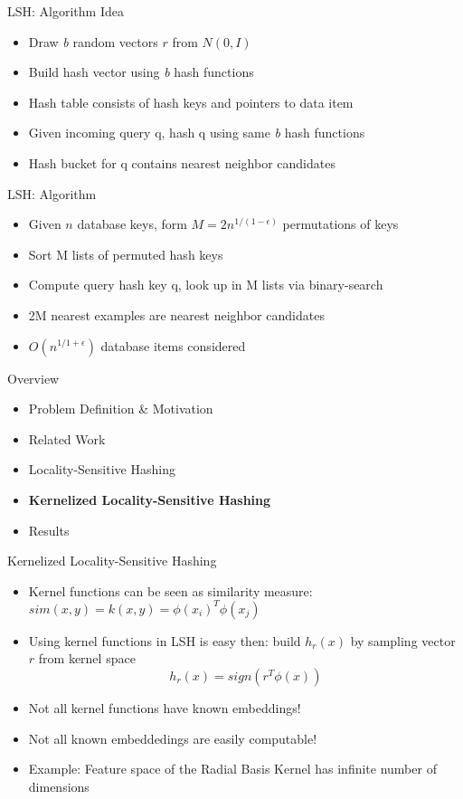 \documentclass[12pt,a4paper]{beamer}
\begin{document}
\begin{frame}{LSH: Algorithm Idea}
\begin{itemize}
\item Draw \textit{b} random vectors $r$ from $N(0,I)$
\item Build hash vector using \textit{b} hash functions
\item Hash table consists of hash keys and pointers to data item
\item Given incoming query q, hash q using same \textit{b} hash functions
\item Hash bucket for q contains nearest neighbor candidates
\end{itemize}
\end{frame}

\begin{frame}{LSH: Algorithm}
\begin{itemize}
\item Given $n$ database keys, form $M=2n^{1/(1-\epsilon)}$ permutations of keys
\item Sort M lists of permuted hash keys
\item Compute query hash key q, look up in M lists via binary-search
\item 2M nearest examples are nearest neighbor candidates
\item $O(n^{1/1+\epsilon})$ database items considered
\end{itemize}
\end{frame}

\begin{frame}{Overview}
\begin{itemize}
\item Problem Definition \& Motivation
\item Related Work
\item Locality-Sensitive Hashing
\item \textbf{Kernelized Locality-Sensitive Hashing}
\item Results
\end{itemize}
\end{frame}

\begin{frame}{Kernelized Locality-Sensitive Hashing}
\begin{itemize}
\item Kernel functions can be seen as similarity measure: $sim(x,y) = k(x,y) = \phi(x_{i})^{T}\phi(x_{j}) $
\item Using kernel functions in LSH is easy then: build $h_r(x)$ by sampling vector $r$ from kernel space
$$h_r(x)=sign(r^T\phi(x))$$
\item Not all kernel functions have known embeddings! \cite{klsh}
\item Not all known embeddedings are easily computable!
\item Example: Feature space of the Radial Basis Kernel has infinite number of dimensions
\end{itemize}
\end{frame}
\end{document}

